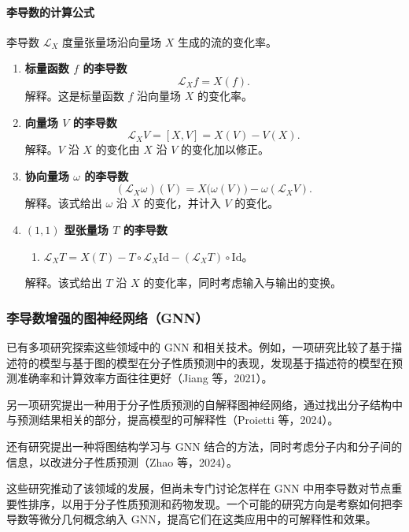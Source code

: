 \paragraph{李导数的计算公式}
李导数 $\mathcal L_X$ 度量张量场沿向量场 $X$ 生成的流的变化率。
\begin{enumerate}[label=\alph*.]
  \item \textbf{标量函数 $f$ 的李导数}
  \[
    \mathcal L_X f=X(f).
  \]
  解释。这是标量函数 $f$ 沿向量场 $X$ 的变化率。

  \item \textbf{向量场 $V$ 的李导数}
  \[
    \mathcal L_X V=[X,V]=X(V)-V(X).
  \]
  解释。$V$ 沿 $X$ 的变化由 $X$ 沿 $V$ 的变化加以修正。

  \item \textbf{协向量场 $\omega$ 的李导数}
  \[
    (\mathcal L_X\omega)(V)=X\bigl(\omega(V)\bigr)-\omega(\mathcal L_XV).
  \]
  解释。该式给出 $\omega$ 沿 $X$ 的变化，并计入 $V$ 的变化。

  \item \textbf{$(1,1)$ 型张量场 $T$ 的李导数}
  \begin{enumerate}[label=\alph*.]
    \item $\mathcal L_X T=X(T)-T\circ\mathcal L_X\mathrm{Id}-(\mathcal L_X T)\circ\mathrm{Id}$。
  \end{enumerate}
  解释。该式给出 $T$ 沿 $X$ 的变化率，同时考虑输入与输出的变换。
\end{enumerate}

\subsubsection{李导数增强的图神经网络（GNN）}
已有多项研究探索这些领域中的 GNN 和相关技术。例如，一项研究比较了基于描述符的模型与基于图的模型在分子性质预测中的表现，发现基于描述符的模型在预测准确率和计算效率方面往往更好（Jiang 等，2021）。

另一项研究提出一种用于分子性质预测的自解释图神经网络，通过找出分子结构中与预测结果相关的部分，提高模型的可解释性（Proietti 等，2024）。

还有研究提出一种将图结构学习与 GNN 结合的方法，同时考虑分子内和分子间的信息，以改进分子性质预测（Zhao 等，2024）。

这些研究推动了该领域的发展，但尚未专门讨论怎样在 GNN 中用李导数对节点重要性排序，以用于分子性质预测和药物发现。一个可能的研究方向是考察如何把李导数等微分几何概念纳入 GNN，提高它们在这类应用中的可解释性和效果。

